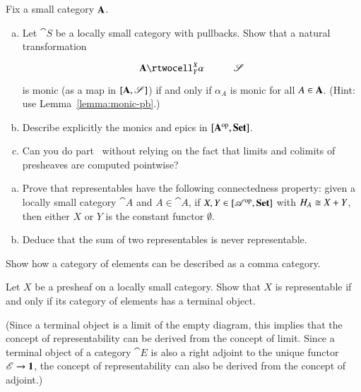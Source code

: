 \exs


\begin{question}
Fix a small category $\mathbf{A}$.
%
\begin{enumerate}[(b)]
\item
Let $\cat{S}$ be a locally small category with pullbacks.  Show that a
natural transformation
\[
\xymatrix{
\scat{A} \rtwocell^X_Y{\alpha} &\cat{S}
}
\]
is monic (as a map in $[\mathbf{A},\mathscr{S}]$) if and only if $\alpha_A$
is monic for all $A \in \mathbf{A}$.  (Hint: use Lemma~\ref{lemma:monic-pb}.)

\item
\label{part:monic-epic-transf}
Describe explicitly the monics and epics in $[\mathbf{A}^{\mathrm{op}},\mathbf{Set}]$.%
%
%
%

\item
Can you do part~ without relying on the fact
that limits and colimits of presheaves are computed pointwise?
\end{enumerate}
\end{question}


\begin{question}
\begin{enumerate}[(b)]
\item
Prove that representables have the following connectedness%
%
%
property: given a locally small category $\cat{A}$ and $A \in \cat{A}$, if
$X, Y \in [\mathscr{A}^{\mathrm{op}},\mathbf{Set}]$ with $H_A \cong X + Y$, then either $X$ or $Y$ is
the constant functor $\emptyset$.

\item
Deduce that the sum%
%
%
of two representables is never representable.
\end{enumerate}
\end{question}


\begin{question}
Show how a category of elements can be described as a comma category.
\end{question}


\begin{question}
Let $X$ be a presheaf on a locally small category.  Show that $X$ is
representable if and only if its category of elements has a terminal
object.

(Since a terminal object is a limit of the empty diagram, this implies that
the concept of representability can be derived from the concept of limit.
Since a terminal object of a category $\cat{E}$ is also a right adjoint to
the unique functor $\mathscr{E} \to \mathbf{1}$, the concept of representability can
also be derived from the concept of adjoint.)
\end{question}


